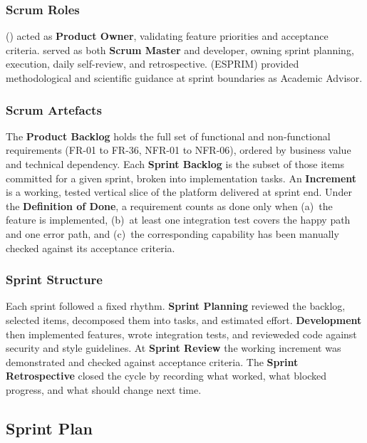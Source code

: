 \subsubsection{Scrum Roles}

\textbf{\IndustrialSupervisor{}} (\CompanyName) acted as \textbf{Product Owner},
validating feature priorities and acceptance criteria. \StudentName served as both
\textbf{Scrum Master} and developer, owning sprint planning, execution, daily
self-review, and retrospective. \textbf{\AcademicSupervisor{}} (ESPRIM) provided
methodological and scientific guidance at sprint boundaries as Academic Advisor.

\subsubsection{Scrum Artefacts}

The \textbf{Product Backlog} holds the full set of functional and non-functional
requirements (FR-01 to FR-36, NFR-01 to NFR-06), ordered by business value and
technical dependency. Each \textbf{Sprint Backlog} is the subset of those items
committed for a given sprint, broken into implementation tasks. An
\textbf{Increment} is a working, tested vertical slice of the platform delivered at
sprint end. Under the \textbf{Definition of Done}, a requirement counts as done
only when (a)~the feature is implemented, (b)~at least one integration test covers
the happy path and one error path, and (c)~the corresponding capability has been
manually checked against its acceptance criteria.

\subsubsection{Sprint Structure}

Each sprint followed a fixed rhythm. \textbf{Sprint Planning} reviewed the backlog,
selected items, decomposed them into tasks, and estimated effort.
\textbf{Development} then implemented features, wrote integration tests, and
revieweded code against security and style guidelines. At \textbf{Sprint Review} the
working increment was demonstrated and checked against acceptance criteria. The
\textbf{Sprint Retrospective} closed the cycle by recording what worked, what
blocked progress, and what should change next time.

\subsection{Sprint Plan}

